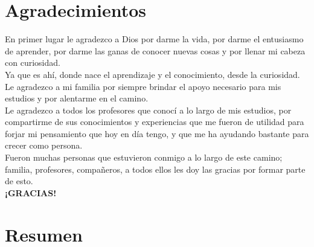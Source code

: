 \documentclass[12pt,titlepage]{article}
\begin{document}
\section*{Agradecimientos}
En primer lugar le agradezco a Dios por darme la vida, por darme el entusiasmo de aprender, por darme las ganas de conocer nuevas cosas y por llenar mi cabeza con curiosidad. \\

Ya que es ahí, donde nace el aprendizaje y el conocimiento, desde la curiosidad. \\

Le agradezco a mi familia por siempre brindar el apoyo necesario para mis estudios y por alentarme en el camino. \\

Le agradezco a todos los  profesores que conocí a lo largo de mis estudios, por compartirme de sus conocimientos y experiencias que me fueron de utilidad para forjar mi pensamiento que hoy en día tengo, y que me ha ayudando bastante para crecer como persona. \\





Fueron muchas personas que estuvieron conmigo a lo largo de este camino; familia, profesores, compañeros, a todos ellos les doy las gracias por formar parte de esto. \\

\textbf{¡GRACIAS!}
 
\newpage
\section*{Resumen}
\newpage
{}
\tableofcontents %
\newpage %
\listoffigures %
\newpage
\listoftables %
\newpage
\end{document}
